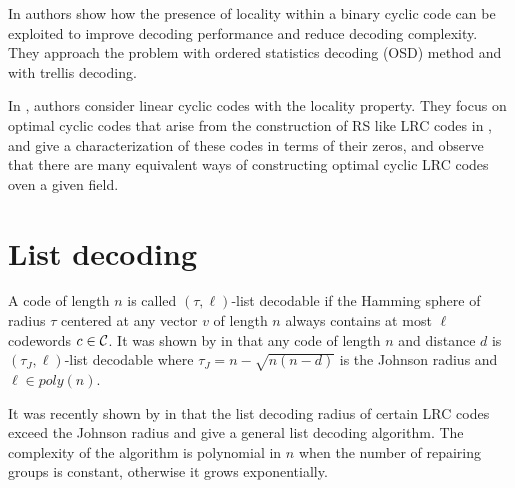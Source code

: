 In \cite{binary_LRC_decoding2} authors show how the presence of locality within a binary cyclic code can be exploited to improve decoding performance and reduce decoding complexity. They approach the problem with ordered statistics decoding (OSD) method and with trellis decoding.

In \cite{binary_constructions}, authors consider linear cyclic codes with the locality property. They focus on optimal cyclic codes that arise from the construction of RS like LRC codes in \cite{optimal_LRC}, and give a characterization of these codes in terms of their zeros, and observe that there are many equivalent ways of constructing optimal cyclic LRC codes oven a given field.

\section{List decoding}
A code of length $n$ is called $(\tau,\ell)$-list decodable if the Hamming sphere of radius $\tau$ centered at any vector $v$ of length $n$ always contains at most $\ell$ codewords $c \in {\mathcal C}$. It was shown by \citeauthor{list_decoding} in \cite{list_decoding} that any code of length $n$ and distance $d$ is $(\tau_J, \ell)$-list decodable where $\tau_J = n - \sqrt{n(n-d)}$ is the Johnson radius and $\ell \in poly(n)$.

It was recently shown by \citeauthor{list_decoding_LRC} in \cite{list_decoding_LRC} that the list decoding radius of certain LRC codes exceed the Johnson radius and give a general list decoding algorithm. The complexity of the algorithm is polynomial in $n$ when the number of repairing groups is constant, otherwise it grows exponentially.